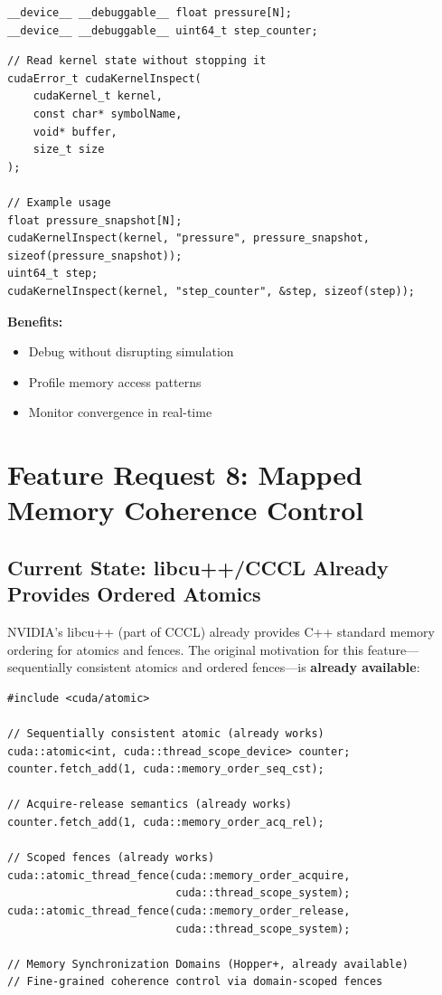 \documentclass[11pt,a4paper]{article}
\newenvironment{benefitsbox}{%
    \vspace{6pt}%
    \noindent\textbf{Benefits:}%
    \begin{itemize}[leftmargin=1.5em,topsep=2pt,itemsep=1pt]%
}{%
    \end{itemize}%
    \vspace{6pt}%
}
\begin{document}
\begin{lstlisting}[style=cstyle,title={Mark variables as debuggable}]
__device__ __debuggable__ float pressure[N];
__device__ __debuggable__ uint64_t step_counter;
\end{lstlisting}

\begin{lstlisting}[style=cstyle,title={Host-side inspection}]
// Read kernel state without stopping it
cudaError_t cudaKernelInspect(
    cudaKernel_t kernel,
    const char* symbolName,
    void* buffer,
    size_t size
);

// Example usage
float pressure_snapshot[N];
cudaKernelInspect(kernel, "pressure", pressure_snapshot, sizeof(pressure_snapshot));
uint64_t step;
cudaKernelInspect(kernel, "step_counter", &step, sizeof(step));
\end{lstlisting}

\begin{benefitsbox}
    \item Debug without disrupting simulation
    \item Profile memory access patterns
    \item Monitor convergence in real-time
\end{benefitsbox}

\newpage

\section{Feature Request 8: Mapped Memory Coherence Control}

\subsection{Current State: libcu++/CCCL Already Provides Ordered Atomics}

NVIDIA's libcu++ (part of CCCL) already provides C++ standard memory ordering for atomics and fences. The original motivation for this feature---sequentially consistent atomics and ordered fences---is \textbf{already available}:

\begin{lstlisting}[style=cstyle,title={Existing: libcu++ ordered atomics (CCCL)}]
#include <cuda/atomic>

// Sequentially consistent atomic (already works)
cuda::atomic<int, cuda::thread_scope_device> counter;
counter.fetch_add(1, cuda::memory_order_seq_cst);

// Acquire-release semantics (already works)
counter.fetch_add(1, cuda::memory_order_acq_rel);

// Scoped fences (already works)
cuda::atomic_thread_fence(cuda::memory_order_acquire,
                          cuda::thread_scope_system);
cuda::atomic_thread_fence(cuda::memory_order_release,
                          cuda::thread_scope_system);

// Memory Synchronization Domains (Hopper+, already available)
// Fine-grained coherence control via domain-scoped fences
\end{lstlisting}
\end{document}
